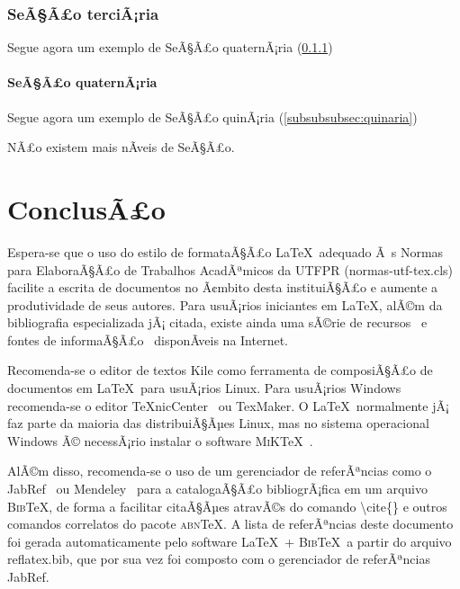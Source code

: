 \documentclass[openright]{normas-utf-tex} %
\begin{document}
\subsection{SeÃ§Ã£o terciÃ¡ria}
\label{subsec:terciaria}

Segue agora um exemplo de SeÃ§Ã£o quaternÃ¡ria (\ref{subsubsec:quaternaria})

\subsubsection{SeÃ§Ã£o quaternÃ¡ria}
\label{subsubsec:quaternaria}

Segue agora um exemplo de SeÃ§Ã£o quinÃ¡ria (\ref{subsubsubsec:quinaria})

\label{subsubsubsec:quinaria}

NÃ£o existem mais nÃ­veis de SeÃ§Ã£o.

\chapter{ConclusÃ£o}
\label{chap:conclusao}

Espera-se que o uso do estilo de formataÃ§Ã£o \LaTeX\ adequado Ã s Normas para ElaboraÃ§Ã£o de Trabalhos AcadÃªmicos da UTFPR ({\ttfamily normas-utf-tex.cls}) facilite a escrita de documentos no Ã¢mbito desta instituiÃ§Ã£o e aumente a produtividade de seus autores. Para usuÃ¡rios iniciantes em \LaTeX, alÃ©m da bibliografia especializada jÃ¡ citada, existe ainda uma sÃ©rie de recursos~\cite{CTAN2009} e fontes de informaÃ§Ã£o~\cite{TeX-Br2009,Wikibooks2009} disponÃ­veis na Internet.

Recomenda-se o editor de textos Kile como ferramenta de composiÃ§Ã£o de documentos em \LaTeX\ para usuÃ¡rios Linux. Para usuÃ¡rios Windows recomenda-se o editor \TeX nicCenter~\cite{TeXnicCenter2009} ou TexMaker. O \LaTeX\ normalmente jÃ¡ faz parte da maioria das distribuiÃ§Ãµes Linux, mas no sistema operacional Windows Ã© necessÃ¡rio instalar o software \textsc{MiK}\TeX~\cite{MiKTeX2009}.

AlÃ©m disso, recomenda-se o uso de um gerenciador de referÃªncias como o JabRef~\cite{JabRef2009} ou Mendeley~\cite{Mendeley2009} para a catalogaÃ§Ã£o bibliogrÃ¡fica em um arquivo \textsc{Bib}\TeX, de forma a facilitar citaÃ§Ãµes atravÃ©s do comando {\ttfamily \textbackslash cite\{\}} e outros comandos correlatos do pacote \textsc{abn}\TeX. A lista de referÃªncias deste documento foi gerada automaticamente pelo software \LaTeX\ + \textsc{Bib}\TeX\ a partir do arquivo {\ttfamily reflatex.bib}, que por sua vez foi composto com o gerenciador de referÃªncias JabRef.
\end{document}
